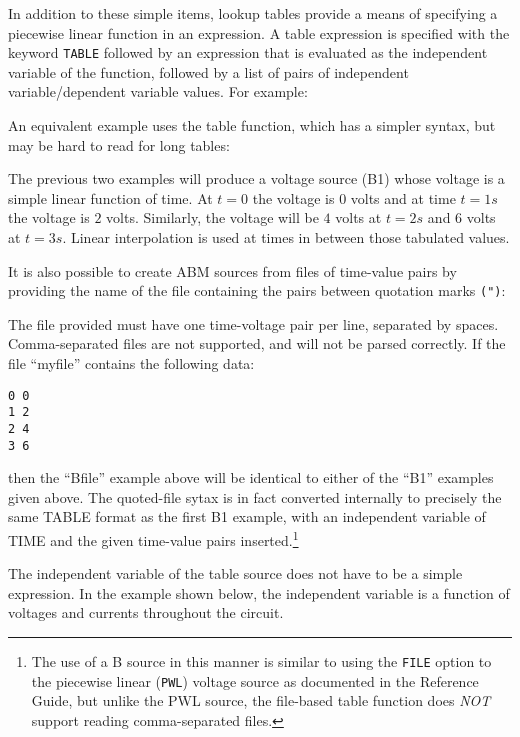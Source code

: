 In addition to these simple items, lookup tables provide a means of
specifying a piecewise linear function in an expression.  A table expression is
specified with the keyword \verb+TABLE+ followed by an expression that
is evaluated as the independent variable of the function, followed by a
list of pairs of independent variable/dependent variable values.  For
example:


An equivalent example uses the table function, which has a simpler syntax, but
 may be hard to read for long tables:


The previous two examples will produce a voltage source (B1) whose voltage
is a simple linear function of time.  At $t=0$ the voltage is $0$ volts and 
at time $t=1s$ the voltage is $2$ volts.  Similarly, the voltage will
be $4$ volts at $t=2s$ and $6$ volts at $t=3s$. Linear interpolation is
used at times in between those tabulated values.

It is also possible to create ABM sources from files of time-value pairs by providing the name of the file containing the pairs between quotation marks \texttt{(")}:


The file provided must have one time-voltage pair per line, separated
by spaces.  Comma-separated files are not supported, and will not be
parsed correctly.  If the file ``myfile'' contains the following data:
\begin{verbatim}
0 0
1 2
2 4
3 6
\end{verbatim}
then the ``Bfile'' example above will be identical to either of the
``B1'' examples given above.  The quoted-file sytax is in fact converted
internally to precisely the same TABLE format as the first B1 example,
with an independent variable of TIME and the given time-value pairs
inserted.\footnote{The use of a B source in this manner is similar to using the \texttt{FILE} option to the piecewise linear (\texttt{PWL}) voltage source as documented in the \Xyce{} Reference Guide\ReferenceGuide, but unlike the PWL source, the file-based table function does {\em NOT\/} support reading comma-separated files.}

The independent variable of the table source does not have to be a
simple expression.  In the example shown below, the independent variable is
a function of voltages and currents throughout the circuit.

